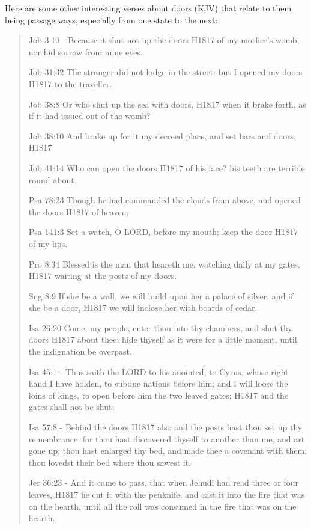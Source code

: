 \documentclass[11pt]{article}
\begin{document}
Here are some other interesting verses about doors (KJV) that relate to them being passage ways, especially from one state to the next:
\begin{quote}
Job 3:10 - Because it shut not up the doors H1817 of my mother's womb, nor hid sorrow from mine eyes.

Job 31:32
The stranger did not lodge in the street: but I opened my doors H1817 to the traveller.

Job 38:8
Or who shut up the sea with doors, H1817 when it brake forth, as if it had issued out of the womb?

Job 38:10
And brake up for it my decreed place, and set bars and doors, H1817

Job 41:14
Who can open the doors H1817 of his face? his teeth are terrible round about.

Psa 78:23
Though he had commanded the clouds from above, and opened the doors H1817 of heaven,

Psa 141:3 
Set a watch, O LORD, before my mouth; keep the door H1817 of my lips.

Pro 8:34 
Blessed is the man that heareth me, watching daily at my gates, H1817 waiting at the posts of my doors.

Sng 8:9 
If she be a wall, we will build upon her a palace of silver: and if she be a door, H1817 we will inclose her with boards of cedar.


Isa 26:20 
Come, my people, enter thou into thy chambers, and shut thy doors H1817 about thee: hide thyself as it were for a little moment, until the indignation be overpast.


Isa 45:1 - Thus saith the LORD to his anointed, to Cyrus, whose right hand I have holden, to subdue nations before him; and I will loose the loins of kings, to open before him the two leaved gates; H1817 and the gates shall not be shut;

Isa 57:8 - Behind the doors H1817 also and the posts hast thou set up thy remembrance: for thou hast discovered thyself to another than me, and art gone up; thou hast enlarged thy bed, and made thee a covenant with them; thou lovedst their bed where thou sawest it.

Jer 36:23 - And it came to pass, that when Jehudi had read three or four leaves, H1817 he cut it with the penknife, and cast it into the fire that was on the hearth, until all the roll was consumed in the fire that was on the hearth.



\end{quote}
\end{document}
